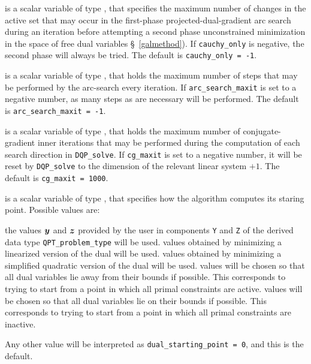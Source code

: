 \begin{description}
 is a scalar variable of type \integer, that specifies
the maximum number of changes in the active set that may occur in the
first-phase projected-dual-gradient arc search during an iteration before
attempting a second phase unconstrained minimization in the space of
free dual variables \S~\ref{galmethod}). If {\tt cauchy\_only} is negative,
the second phase will always be tried.
The default is {\tt cauchy\_only = -1}.

 is a scalar variable of type \integer,
that holds the maximum number of steps that may be performed
by the arc-search every iteration.
If {\tt arc\_search\_maxit} is set to a negative number, as many steps
as are necessary will be performed.
The default is {\tt arc\_search\_maxit = -1}.

 is a scalar variable of type \integer, that holds the
maximum number of conjugate-gradient inner iterations that may be performed
during the computation of each search direction in {\tt DQP\_solve}.
If {\tt cg\_maxit} is set to a negative number, it will be reset by
{\tt DQP\_solve} to the dimension of the relevant linear system $+ 1$.
The default is {\tt cg\_maxit = 1000}.

 is a scalar variable of type \integer, that
specifies how the algorithm computes its staring point.
Possible values are:
\begin{description}
 the values ${\bm{y}}$ and ${\bm{z}}$
        provided by the user in components {\tt Y} and {\tt Z}
        of the derived data type {\tt QPT\_problem\_type} will be used.
 values obtained by minimizing a linearized version of the dual
        will be used.
 values obtained by minimizing a simplified quadratic version of
        the dual will be used.
 values will be chosen so that all dual variables lie away from
        their bounds if possible. This corresponds to trying to start
        from a point in which all primal constraints are active.
 values will be chosen so that all dual variables lie on
        their bounds if possible. This corresponds to trying to start
        from a point in which all primal constraints are inactive.
\end{description}
Any other value will be interpreted as {\tt dual\_starting\_point = 0},
and this is the default.



\end{description}
